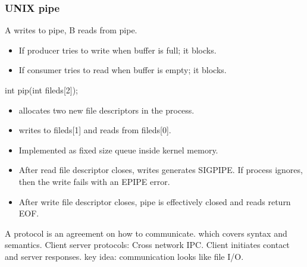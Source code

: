 \subsubsection{UNIX pipe}
A writes to pipe, B reads from pipe.
\begin{itemize}
    \item If producer tries to write when buffer is full; it blocks.
    \item If consumer tries to read when buffer is empty; it blocks.
\end{itemize}
int pip(int fileds[2]);
\begin{itemize}
    \item allocates two new file descriptors in the process.
    \item writes to fileds[1] and reads from fileds[0].
    \item Implemented as fixed size queue inside kernel memory.
    \item After read file descriptor closes, writes generates SIGPIPE. If process ignores, then the write fails with an EPIPE error.
    \item After write file descriptor closes, pipe is effectively closed and reads return EOF.
\end{itemize}

A protocol is an agreement on how to communicate. which covers syntax and semantics.
Client server protocols: Cross network IPC.
Client initiates contact and server responses.
key idea: communication looks like file I/O.